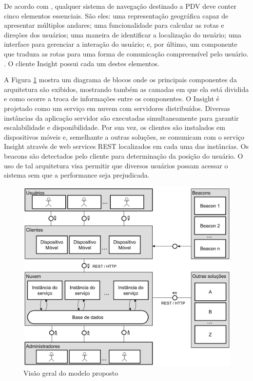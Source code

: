 \documentclass[twoside,english,brazilian]{UNISINOSartigo}
\begin{document}
De acordo com , qualquer sistema de navegação destinado a PDV deve conter cinco elementos essenciais. São eles: uma representação geográfica capaz de apresentar múltiplos andares; uma funcionalidade para calcular as rotas e direções dos usuários; uma maneira de identificar a localização do usuário; uma interface para gerenciar a interação do usuário; e, por último, um componente que traduza as rotas para uma forma de comunicação compreensível pelo usuário. \cite{gedawy2011designing}. O cliente Insight possui cada um destes elementos.

A Figura \ref{fig:arquitetura} mostra um diagrama de blocos onde os principais componentes da arquitetura são exibidos, mostrando também as camadas em que ela está dividida e como ocorre a troca de informações entre os componentes. O Insight é projetado como um serviço em nuvem com servidores distribuídos. Diversas instâncias da aplicação servidor são executadas simultaneamente para garantir escalabilidade e disponibilidade. Por sua vez, os clientes são instalados em dispositivos móveis e, semelhante a outras soluções, se comunicam com o serviço Insight através de web services REST localizados em cada uma das instâncias. Os beacons são detectados pelo cliente para determinação da posição do usuário.
O uso de tal arquitetura visa permitir que diversos usuários possam acessar o sistema sem que a performance seja prejudicada. 


\begin{figure}[!ht]
	\caption{Visão geral do modelo proposto}
	\label{fig:arquitetura}
	\centering%
	\begin{minipage}{.6\textwidth}
		\includegraphics[width=\textwidth]{imgs/arquitetura.png}
	\end{minipage}
\end{figure}
\end{document}
